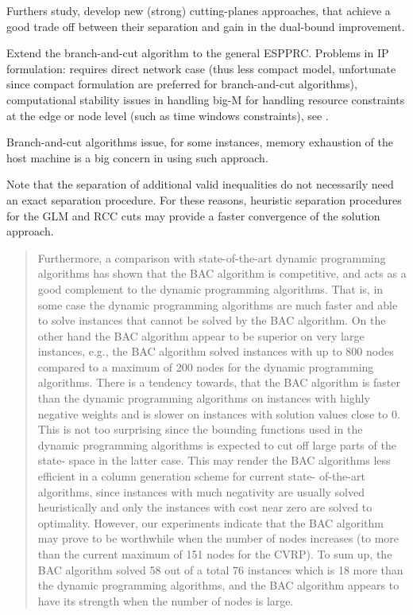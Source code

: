 Furthers study, develop new (strong) cutting-planes approaches,
that achieve a good trade off between their separation and gain
in the dual-bound improvement.

Extend the branch-and-cut algorithm
to the general ESPPRC.
Problems in IP formulation:
requires direct network case (thus less compact model, unfortunate since compact formulation are
preferred for branch-and-cut algorithms),
computational stability issues in handling big-M
for handling resource constraints at the edge or node level (such as time windows constraints),
see \textcite{jepsen2008branchandcut}.

Branch-and-cut algorithms issue, for some instances,
memory exhaustion of the host machine is a big concern in using such approach.

Note that the separation of additional valid inequalities do not
necessarily need an exact separation procedure.
For these reasons, heuristic separation procedures for the GLM and RCC
cuts may provide a faster convergence of the solution approach.

\begin{quote}
	\cite{jepsen2014}
	Furthermore, a comparison with state-of-the-art dynamic programming algorithms has
	shown that the BAC algorithm is competitive, and acts as a good complement to the dynamic programming algorithms.
	That is, in some case the dynamic programming algorithms are much faster and able to solve instances that cannot be
	solved by the BAC algorithm. On the other hand the BAC algorithm appear to be superior on very large instances, e.g., the
	BAC algorithm solved instances with up to 800 nodes compared to a maximum of 200 nodes for the dynamic programming
	algorithms. There is a tendency towards, that the BAC algorithm is faster than the dynamic programming algorithms on
	instances with highly negative weights and is slower on instances with solution values close to 0. This is not too surprising
	since the bounding functions used in the dynamic programming algorithms is expected to cut off large parts of the state-
	space in the latter case. This may render the BAC algorithms less efficient in a column generation scheme for current state-
	of-the-art algorithms, since instances with much negativity are usually solved heuristically and only the instances with cost
	near zero are solved to optimality. However, our experiments indicate that the BAC algorithm may prove to be worthwhile
	when the number of nodes increases (to more than the current maximum of 151 nodes for the CVRP). To sum up, the BAC
	algorithm solved 58 out of a total 76 instances which is 18 more than the dynamic programming algorithms, and the BAC
	algorithm appears to have its strength when the number of nodes is large.
\end{quote}

